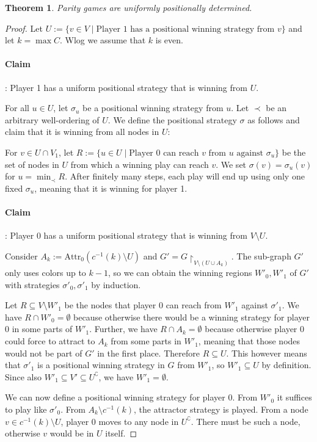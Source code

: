 \documentclass{article}
\newtheorem{theorem}{Theorem}
\begin{document}
\begin{theorem}
	Parity games are uniformly positionally determined.
\end{theorem}
\begin{proof}
	Let $U := \{ v \in V \mid \text{Player 1 has a positional winning strategy from } v \}$ and let $k = \max C$. Wlog we assume that $k$ is even.
	
	\paragraph{Claim}: Player 1 has a uniform positional strategy that is winning from $U$.
	
	For all $u \in U$, let $\sigma_u$ be a positional winning strategy from $u$. Let $\prec$ be an arbitrary well-ordering of $U$. We define the positional strategy $\sigma$ as follows and claim that it is winning from all nodes in $U$:
	
	For $v \in U \cap V_1$, let $R := \{ u \in U \mid \text{Player 0 can reach } v \text{ from } u \text{ against } \sigma_u \}$ be the set of nodes in $U$ from which a winning play can reach $v$. We set $\sigma(v) = \sigma_u(v)$ for $u = \min_\prec R$. After finitely many steps, each play will end up using only one fixed $\sigma_u$, meaning that it is winning for player 1.
	
	\paragraph{Claim}: Player 0 has a uniform positional strategy that is winning from $V \setminus U$.
	
	Consider $A_k := \text{Attr}_0(c^{-1}(k) \setminus U)$ and $G' = G \upharpoonright_{V \setminus (U \cup A_k)}$. The sub-graph $G'$ only uses colors up to $k-1$, so we can obtain the winning regions $W'_0, W'_1$ of $G'$ with strategies $\sigma'_0, \sigma'_1$ by induction. 

	Let $R \subseteq V \setminus W'_1$ be the nodes that player 0 can reach from $W'_1$ against $\sigma'_1$. We have $R \cap W'_0 = \emptyset$ because otherwise there would be a winning strategy for player 0 in some parts of $W'_1$. Further, we have $R \cap A_k = \emptyset$ because otherwise player 0 could force to attract to $A_k$ from some parts in $W'_1$, meaning that those nodes would not be part of $G'$ in the first place. Therefore $R \subseteq U$. This however means that $\sigma'_1$ is a positional winning strategy in $G$ from $W'_1$, so $W'_1 \subseteq U$ by definition. Since also $W'_1 \subseteq V' \subseteq U^\complement$, we have $W'_1 = \emptyset$.
	
	We can now define a positional winning strategy for player 0. From $W'_0$ it suffices to play like $\sigma'_0$. From $A_k \setminus c^{-1}(k)$, the attractor strategy is played. From a node $v \in c^{-1}(k) \setminus U$, player 0 moves to any node in $U^\complement$. There must be such a node, otherwise $v$ would be in $U$ itself.
\end{proof}
\end{document}
